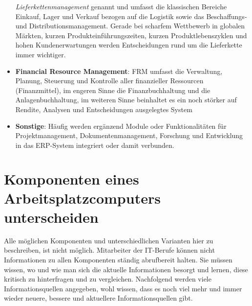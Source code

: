 \documentclass[a4paper, 12pt]{report}
\begin{document}
\begin{itemize}
	\emph{Lieferkettenmanagement} genannt und umfasst die klassischen
	Bereiche Einkauf, Lager und Verkauf bezogen auf die Logistik sowie das
	Beschaffungs- und Distributionsmanagement. Gerade bei scharfem
	Wettbewerb in globalen Märkten, kurzen Produkteinführungszeiten, kurzen
	Produktlebenszyklen und hohen Kundenerwartungen werden Entscheidungen
	rund um die Lieferkette immer wichtiger.
    \item \textbf{Financial Resource Management}: FRM umfasst die Verwaltung,
	Planung, Steuerung und Kontrolle aller finanzieller Ressourcen
	(Finanzmittel), im engeren Sinne die Finanzbuchhaltung und die
	Anlagenbuchhaltung, im weiteren Sinne beinhaltet es ein noch störker auf
	Rendite, Analysen und Entscheidungen ausgelegtes System
    \item \textbf{Sonstige}: Häufig werden ergänzend Module oder
	Funktionalitäten für Projektmanagement, Dokumentenmanagement, Forschung
	und Entwicklung in das ERP-System integriert oder damit verbunden.
\end{itemize}

\newpage
\section{Komponenten eines Arbeitsplatzcomputers unterscheiden}

Alle möglichen Komponenten und unterschiedlichen Varianten hier zu beschreiben,
ist nicht möglich. Mitarbeiter der IT-Berufe können nicht Informationen zu allen
Komponenten ständig abrufbereit halten. Sie müssen wissen, wo und wie man sich
die aktuelle Informationen besorgt und lernen, diese kritisch zu hinterfragen
und zu vergleichen. Nachfolgend werden viele Informationsquellen angegeben, wohl
wissen, dass es noch viel mehr und immer wieder neuere, bessere und aktuellere
Informationsquellen gibt. \\
\end{document}
